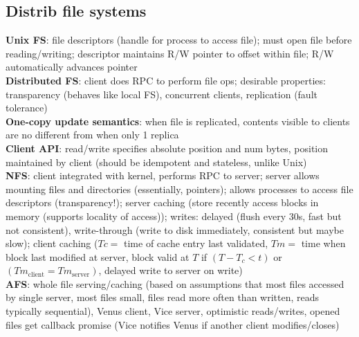 \documentclass{article}
\begin{document}
\begin{multicols*}{3}
\section{Distrib file systems}
\textbf{Unix FS}: file descriptors (handle for process to access file); must open file before reading/writing; descriptor maintains R/W pointer to offset within file; R/W automatically advances pointer \\
\textbf{Distributed FS}: client does RPC to perform file ops; desirable properties: transparency (behaves like local FS), concurrent clients, replication (fault tolerance) \\
\textbf{One-copy update semantics}: when file is replicated, contents visible to clients are no different from when only 1 replica \\
\textbf{Client API}: read/write specifies absolute position and num bytes, position maintained by client (should be idempotent and stateless, unlike Unix) \\
\textbf{NFS}: client integrated with kernel, performs RPC to server; server allows mounting files and directories (essentially, pointers); allows processes to access file descriptors (transparency!); server caching (store recently access blocks in memory (supports locality of access)); writes: delayed (flush every 30s, fast but not consistent), write-through (write to disk immediately, consistent but maybe slow); client caching ($Tc =$ time of cache entry last validated, $Tm =$ time when block last modified at server, block valid at $T$ if $(T-T_c < t)$ or $(Tm_{\text{client}} = Tm_{\text{server}})$, delayed write to server on write) \\
\textbf{AFS}: whole file serving/caching (based on assumptions that most files accessed by single server, most files small, files read more often than written, reads typically sequential), Venus client, Vice server, optimistic reads/writes, opened files get callback promise (Vice notifies Venus if another client modifies/closes)


\end{multicols*}
\end{document}
